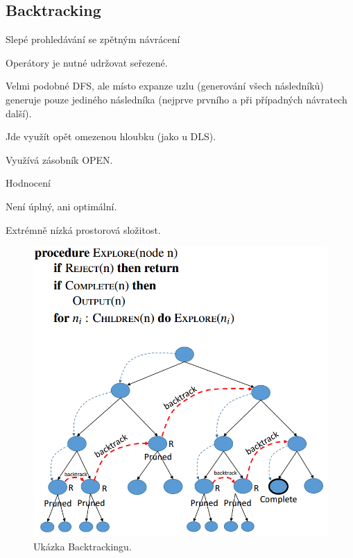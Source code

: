 \subsection{Backtracking}

\begin{compactitem}
    \item Slepé prohledávání se zpětným návrácení \begin{compactitem}
        \item Operátory je nutné udržovat seřezené.
        \item Velmi podobné DFS, ale místo expanze uzlu (generování všech následníků) generuje pouze jediného následníka (nejprve prvního a při případných návratech další).
        \item Jde využít opět omezenou hloubku (jako u DLS).
    \end{compactitem}

    \item Využívá zásobník OPEN.

    \item Hodnocení \begin{compactitem}
        \item Není úplný, ani optimální.
        \item Extrémně nízká prostorová složitost.
    \end{compactitem}

    \begin{figure}[H]
        \centering
        \includegraphics[width=1\linewidth]{backtracking.png}
        \caption{Ukázka Backtrackingu.}
    \end{figure}
\end{compactitem}

